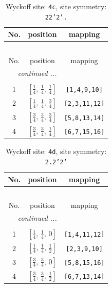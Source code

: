 \documentclass[fleqn,8pt]{jsarticle}
\begin{document}
\renewcommand{\arraystretch}{1.2}
\begin{longtable}{ccc}
\caption{Wyckoff site: {\tt 4c}, site symmetry: {\tt 22'2'.}}
 \\
 \hline \hline
No. & position & mapping \\ \hline \endfirsthead

\multicolumn{2}{l}{\tablename\ \thetable{}} \\
 \hline \hline
No. & position & mapping \\ \hline \endhead

 \hline \hline
\multicolumn{2}{r}{\footnotesize\it continued ...} \\ \endfoot

 \hline \hline
\multicolumn{2}{r}{} \\ \endlastfoot

1 & $\left[ \frac{1}{4},\, \frac{1}{4},\, \frac{1}{4} \right]$ & {\tt [1,4,9,10]} \\ \hline
2 & $\left[ \frac{1}{4},\, \frac{1}{4},\, \frac{3}{4} \right]$ & {\tt [2,3,11,12]} \\ \hline
3 & $\left[ \frac{3}{4},\, \frac{3}{4},\, \frac{3}{4} \right]$ & {\tt [5,8,13,14]} \\ \hline
4 & $\left[ \frac{3}{4},\, \frac{3}{4},\, \frac{1}{4} \right]$ & {\tt [6,7,15,16]} \\
\end{longtable}
\renewcommand{\arraystretch}{1.2}
\begin{longtable}{ccc}
\caption{Wyckoff site: {\tt 4d}, site symmetry: {\tt 2.2'2'}}
 \\
 \hline \hline
No. & position & mapping \\ \hline \endfirsthead

\multicolumn{2}{l}{\tablename\ \thetable{}} \\
 \hline \hline
No. & position & mapping \\ \hline \endhead

 \hline \hline
\multicolumn{2}{r}{\footnotesize\it continued ...} \\ \endfoot

 \hline \hline
\multicolumn{2}{r}{} \\ \endlastfoot

1 & $\left[ \frac{1}{4},\, \frac{1}{4},\, 0 \right]$ & {\tt [1,4,11,12]} \\ \hline
2 & $\left[ \frac{1}{4},\, \frac{1}{4},\, \frac{1}{2} \right]$ & {\tt [2,3,9,10]} \\ \hline
3 & $\left[ \frac{3}{4},\, \frac{3}{4},\, 0 \right]$ & {\tt [5,8,15,16]} \\ \hline
4 & $\left[ \frac{3}{4},\, \frac{3}{4},\, \frac{1}{2} \right]$ & {\tt [6,7,13,14]} \\
\end{longtable}
\end{document}
